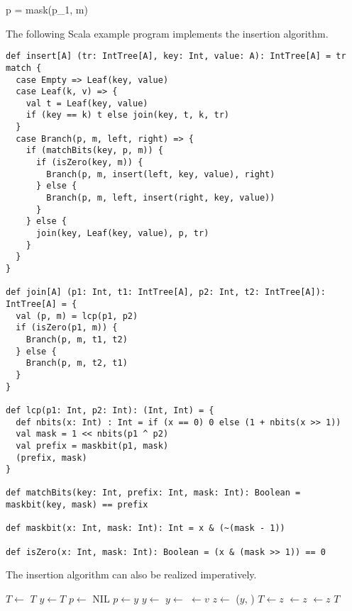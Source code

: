 \documentclass{article}
\begin{document}
\be
p = mask(p_1, m)
\ee

The following Scala example program implements the insertion algorithm.

\lstset{language=Scala}
\begin{lstlisting}
def insert[A] (tr: IntTree[A], key: Int, value: A): IntTree[A] = tr match {
  case Empty => Leaf(key, value)
  case Leaf(k, v) => {
    val t = Leaf(key, value)
    if (key == k) t else join(key, t, k, tr)
  }
  case Branch(p, m, left, right) => {
    if (matchBits(key, p, m)) {
      if (isZero(key, m)) {
        Branch(p, m, insert(left, key, value), right)
      } else {
        Branch(p, m, left, insert(right, key, value))
      }
    } else {
      join(key, Leaf(key, value), p, tr)
    }
  }
}

def join[A] (p1: Int, t1: IntTree[A], p2: Int, t2: IntTree[A]): IntTree[A] = {
  val (p, m) = lcp(p1, p2)
  if (isZero(p1, m)) {
    Branch(p, m, t1, t2)
  } else {
    Branch(p, m, t2, t1)
  }
}

def lcp(p1: Int, p2: Int): (Int, Int) = {
  def nbits(x: Int) : Int = if (x == 0) 0 else (1 + nbits(x >> 1))
  val mask = 1 << nbits(p1 ^ p2)
  val prefix = maskbit(p1, mask)
  (prefix, mask)
}

def matchBits(key: Int, prefix: Int, mask: Int): Boolean = maskbit(key, mask) == prefix

def maskbit(x: Int, mask: Int): Int = x & (~(mask - 1))

def isZero(x: Int, mask: Int): Boolean = (x & (mask >> 1)) == 0
\end{lstlisting}

The insertion algorithm can also be realized imperatively.

\begin{algorithmic}[1]
    \State $T \gets$ 
    \State \Return $T$
  \EndIf
  \State $y \gets T$
  \State $p \gets$ NIL
    \State $p \gets y$
      \State $y \gets$ 
    \Else
      \State $y \gets$ 
    \EndIf
  \EndWhile
    \State {} $\gets v$
  \Else
    \State $z \gets$ ($y$, )
      \State $T \gets z$
    \Else
        \State {} $\gets z$
      \Else
        \State {} $\gets z$
      \EndIf
    \EndIf
  \EndIf
  \State \Return $T$
\EndFunction
\end{algorithmic}
\end{document}
